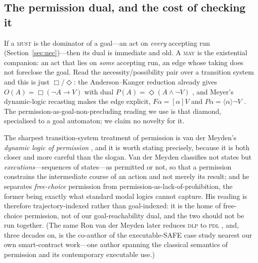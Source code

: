 %

\subsection{The permission dual, and the cost of checking it}
\label{sec:explosion}

If a \textsc{must} is the dominator of a goal---an act on \emph{every} accepting
run (Section~\ref{sec:nec})---then its dual is immediate and old. A \textsc{may}
is the existential companion: an act that lies on \emph{some} accepting run, an
edge whose taking does not foreclose the goal. Read the necessity/possibility
pair over a transition system and this is just $\Box/\Diamond$: the
Anderson--Kanger reduction already gives $O(A)=\Box(\lnot A\to V)$ with dual
$P(A)=\Diamond(A\land\lnot V)$ , and Meyer's dynamic-logic
recasting makes the edge explicit, $F\alpha=[\alpha]V$ and
$P\alpha=\langle\alpha\rangle\lnot V$ . The permission-as-goal-non-precluding reading we use is that
diamond, specialised to a goal automaton; we claim no novelty for it.

The sharpest transition-system treatment of permission is van der Meyden's
\emph{dynamic logic of permission} , and it is worth
stating precisely, because it is both closer and more careful than the slogan.
Van der Meyden classifies not states but \emph{executions}---sequences of
states---as permitted or not, so that a permission constrains the intermediate
course of an action and not merely its result; and he separates
\emph{free-choice} permission from permission-as-lack-of-prohibition, the former
being exactly what standard modal logics cannot capture. His reading is
therefore trajectory-indexed rather than goal-indexed: it is the home of
free-choice permission, not of our goal-reachability dual, and the two should not
be run together. (The same Ron van der Meyden later reduces \textsc{dlp} to
\textsc{pdl} , and, three decades on, is the co-author of
the executable-SAFE case study  nearest our own
smart-contract work---one author spanning the classical semantics of permission
and its contemporary executable use.)

